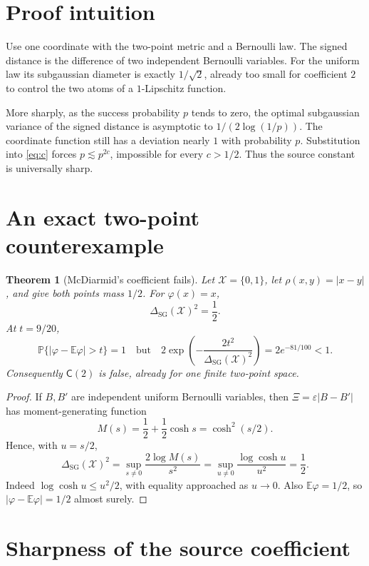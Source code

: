 \documentclass[11pt]{article}
\newtheorem{theorem}{Theorem}
\newcommand{\DSG}{\Delta_{\mathrm{SG}}}
\newcommand{\E}{\mathbb E}
\newcommand{\Pp}{\mathbb P}
\begin{document}
\section{Proof intuition}

Use one coordinate with the two-point metric and a Bernoulli law. The signed
distance is the difference of two independent Bernoulli variables. For the
uniform law its subgaussian diameter is exactly $1/\sqrt2$, already too small
for coefficient $2$ to control the two atoms of a $1$-Lipschitz function.

More sharply, as the success probability $p$ tends to zero, the optimal
subgaussian variance of the signed distance is asymptotic to
$1/(2\log(1/p))$. The coordinate function still has a deviation nearly $1$
with probability $p$. Substitution into \eqref{eq:c} forces
$p\lesssim p^{2c}$, impossible for every $c>1/2$. Thus the source constant is
universally sharp.

\section{An exact two-point counterexample}

\begin{theorem}[McDiarmid's coefficient fails]\label{thm:explicit}
Let $\mathcal X=\{0,1\}$, let $\rho(x,y)=|x-y|$, and give both points mass
$1/2$. For $\varphi(x)=x$,
\[
                  \DSG(\mathcal X)^2=\frac12.
\]
At $t=9/20$,
\[
 \Pp\{|\varphi-\E\varphi|>t\}=1
 \quad\text{but}\quad
 2\exp\!\left(-\frac{2t^2}{\DSG(\mathcal X)^2}\right)
 =2e^{-81/100}<1.
\]
Consequently $\mathsf C(2)$ is false, already for one finite two-point space.
\end{theorem}

\begin{proof}
If $B,B'$ are independent uniform Bernoulli variables, then
$\Xi=\varepsilon|B-B'|$ has moment-generating function
\[
 M(s)=\frac12+\frac12\cosh s=\cosh^2(s/2).
\]
Hence, with $u=s/2$,
\[
 \DSG(\mathcal X)^2
 =\sup_{s\ne0}\frac{2\log M(s)}{s^2}
 =\sup_{u\ne0}\frac{\log\cosh u}{u^2}
 =\frac12.
\]
Indeed $\log\cosh u\leq u^2/2$, with equality approached as $u\to0$.
Also $\E\varphi=1/2$, so $|\varphi-\E\varphi|=1/2$ almost surely.
\end{proof}

\section{Sharpness of the source coefficient}
\end{document}

